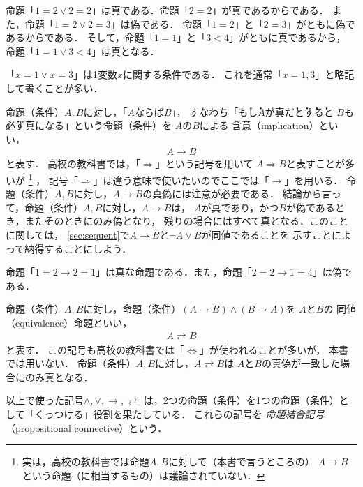   \begin{ex}
    命題「$1=2 \lor 2=2$」は真である．命題「$2=2$」が真であるからである．
    また，命題「$1=2 \lor 2=3$」は偽である．
    命題「$1=2$」と「$2=3$」がともに偽であるからである．
    そして，命題「$1=1$」と「$3<4$」がともに真であるから，
    命題「$1=1 \lor 3<4$」は真となる．

    「$x=1 \lor x=3$」は1変数$x$に関する条件である．
    これを通常「$x = 1, 3$」と略記して書くことが多い．
  \end{ex}

  命題（条件）$A,  B$に対し，「$A$ならば$B$」，
  すなわち「\.も\.し$A$が真\.だ\.と\.す\.ると
  $B$も\.必\.ず真になる」という命題（条件）を
  $A$の$B$による%
  含意（implication）といい，
  \begin{align}
    A \to B
    \label{eq:implication}
  \end{align}
  と表す．
  高校の教科書では，「$\Longrightarrow$」という記号を用いて
  $A \Longrightarrow B$と表すことが多いが
  \footnote{実は，高校の教科書では命題$A,B$に対して（本書で言うところの）
  $A \to B$という命題（に相当するもの）は議論されていない．}
  ，
  記号「$\Longrightarrow$」は違う意味で使いたいのでここでは「$\to$」を用いる．
  命題（条件）$A,  B$に対し，$A \to B$の真偽には注意が必要である．
  結論から言って，命題（条件）$A,  B$に対し，$A \to B$は，
  $A$が真であり，かつ$B$が偽であるとき，またそのときにのみ偽となり，
  残りの場合にはすべて真となる．このことに関しては，
  \ref{sec:sequent}で$A \to B$と$\lnot A \lor B$が同値であることを
  示すことによって納得することにしよう．

  \begin{ex}
    命題「$1=2 \to 2=1$」は真な命題である．また，命題「$2=2 \to 1=4$」は偽である．
  \end{ex}

  命題（条件）$A,  B$に対し，命題（条件）$(A \to B) \land ( B \to A) $を
  $A$と$B$の%
  同値（equivalence）命題といい，
  \begin{align}
    A \rightleftarrows B
    \label{eq:equivalence}
  \end{align}
  と表す．
  この記号も高校の教科書では「$\Longleftrightarrow$」が使われることが多いが，
  本書では用いない．
  命題（条件）$A,  B$に対し，$A \rightleftarrows B$は
  $A$と$B$の真偽が一致した場合にのみ真となる．
  
  以上で使った記号$\land ,  \lor ,  \to ,  \rightleftarrows$
  は，2つの命題（条件）を1つの命題（条件）として「くっつける」役割を果たしている．
  これらの記号を
  \emph{命題結合記号}（propositional connective）という．
  
